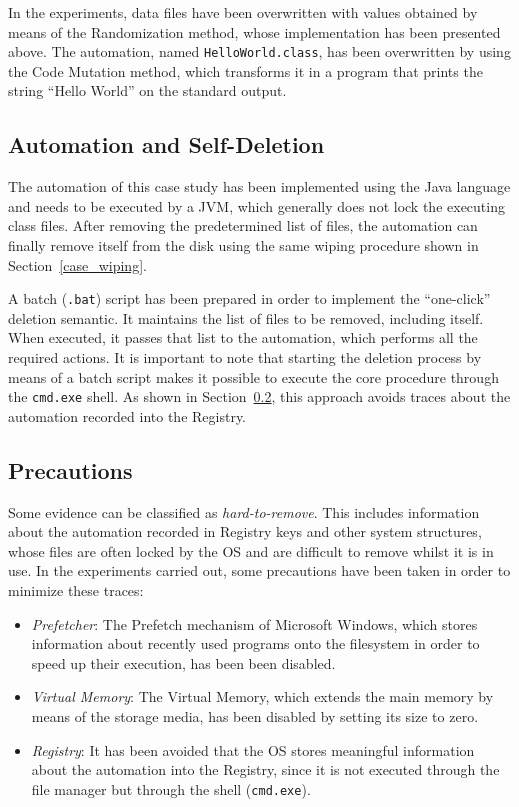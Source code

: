 \documentclass[10pt, conference, compsocconf]{IEEEtran}
\begin{document}
In the experiments, data files have been overwritten with values obtained by means of the Randomization method, whose implementation has been presented above. The automation, named \verb=HelloWorld.class=, has been overwritten by using the Code Mutation method, which transforms it in a program that prints the string ``Hello World'' on the standard output.


\subsection{Automation and Self-Deletion}
The automation of this case study has been implemented using the Java language and needs to be executed by a JVM, which generally does not lock the executing class files. After removing the predetermined list of files, the automation can finally remove itself from the disk using the same wiping procedure shown in Section~\ref{case_wiping}.

A batch (\verb=.bat=) script has been prepared in order to implement the ``one-click'' deletion semantic. It maintains the list of files to be removed, including itself. When executed, it passes that list to the automation, which performs all the required actions. It is important to note that starting the deletion process by means of a batch script makes it possible to execute the core procedure through the \verb=cmd.exe= shell. As shown in Section~\ref{prec}, this approach avoids traces about the automation recorded into the Registry.

\subsection{Precautions}
\label{prec}
Some evidence can be classified as \emph{hard-to-remove}. This includes information about the automation recorded in Registry keys and other system structures, whose files are often locked by the OS and are difficult to remove whilst it is in use.
In the experiments carried out, some precautions have been taken in order to minimize these traces:

\begin{itemize}
  \item \emph{Prefetcher}: The Prefetch mechanism of Microsoft Windows, which stores information about recently used programs onto the filesystem in order to speed up their execution, has been been disabled.
  \item \emph{Virtual Memory}: The Virtual Memory, which extends the main memory by means of the storage media, has been disabled by setting its size to zero.
  \item \emph{Registry}: It has been avoided that the OS stores meaningful information about the automation into the Registry, since it is not executed through the file manager but through the shell (\verb=cmd.exe=).
\end{itemize}
\end{document}

